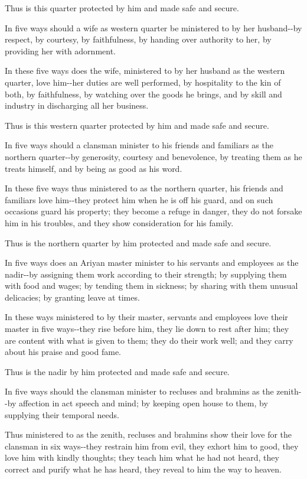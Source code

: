 \documentclass[12pt,twoside]{article}
\begin{document}
Thus is this quarter protected by him and made safe and secure.

In five ways should a wife as western quarter be ministered to by her
husband{}-{}-by respect, by courtesy, by faithfulness, by handing over
authority to her, by providing her with adornment.

In these five ways does the wife, ministered to by her husband as the
western quarter, love him{}-{}-her duties are well performed, by
hospitality to the kin of both, by faithfulness, by watching over the
goods he brings, and by skill and industry in discharging all her
business.

Thus is this western quarter protected by him and made safe and secure.


\bigskip

In five ways should a clansman minister to his friends and familiars as
the northern quarter{}-{}-by generosity, courtesy and benevolence, by
treating them as he treats himself, and by being as good as his word.

In these five ways thus ministered to as the northern quarter, his
friends and familiars love him{}-{}-they protect him when he is off his
guard, and on such occasions guard his property; they become a refuge
in danger, they do not forsake him in his troubles, and they show
consideration for his family.

Thus is the northern quarter by him protected and made safe and secure.

In five ways does an Ariyan master minister to his servants and
employees as the nadir{}-{}-by assigning them work according to their
strength; by supplying them with food and wages; by tending them in
sickness; by sharing with them unusual delicacies; by granting leave at
times.

In these ways ministered to by their master, servants and employees love
their master in five ways{}-{}-they rise before him, they lie down to
rest after him; they are content with what is given to them; they do
their work well; and they carry about his praise and good fame.

Thus is the nadir by him protected and made safe and secure.

In five ways should the clansman minister to recluses and brahmins as
the zenith{}-{}-by affection in act speech and mind; by keeping open
house to them, by supplying their temporal needs.

Thus ministered to as the zenith, recluses and brahmins show their love
for the clansman in six ways{}-{}-they restrain him from evil, they
exhort him to good, they love him with kindly thoughts; they teach him
what he had not heard, they correct and purify what he has heard, they
reveal to him the way to heaven.
\end{document}
